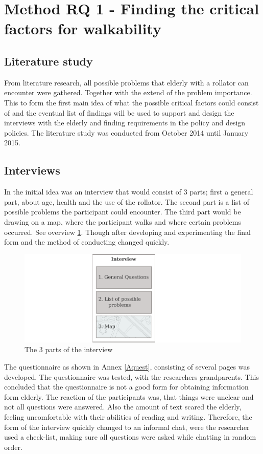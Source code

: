 \section{Method RQ 1 - Finding the critical factors for walkability}\label{rq1}
\subsection{Literature study}
From literature research, all possible problems that elderly with a rollator can encounter were gathered. Together with the extend of the problem importance. This to form the first main idea of what the possible critical factors could consist of and the eventual list of findings will be used to support and design the interviews with the elderly and finding requirements in the policy and design policies.
The literature study was conducted from October 2014 until January 2015. 

\subsection{Interviews}
In the initial idea was an interview that would consist of 3 parts; first a general part, about age, health and the use of the rollator. The second part is a list of possible problems the participant could encounter. The third part would be drawing on a map, where the participant walks and where certain problems occurred. See overview \ref{interview}. Though after developing and experimenting the final form and the method of conducting changed quickly. 

\begin{figure}[h]
\includegraphics[width=\textwidth]{img/M_interview.pdf}
\centering
\caption{The 3 parts of the interview \label{interview}}
\end{figure}

The questionnaire as shown in Annex \ref{Aquest}, consisting of several pages was developed. The questionnaire was tested, with the researchers grandparents. This concluded that the questionnaire is not a good form for obtaining information form elderly. The reaction of the participants was, that things were unclear and not all questions were answered. Also the amount of text scared the elderly, feeling uncomfortable with their abilities of reading and writing. Therefore, the form of the interview quickly changed to an informal chat, were the researcher used a check-list, making sure all questions were asked while chatting in random order.

